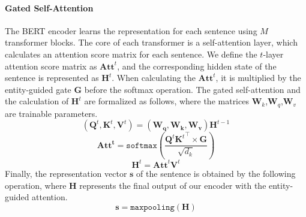 \documentclass[11pt]{article}
\begin{document}
\paragraph{Gated Self-Attention}
The BERT encoder learns the representation for each sentence using $M$ transformer blocks. The core of each transformer is a self-attention layer, which calculates an attention score matrix for each sentence. We define the $t$-layer attention score matrix as $\bm{Att}^{t}$, and the corresponding hidden state of the sentence is represented as $\bm{H}^t$. 
When calculating the $\bm{Att}^{t}$, it is multiplied by the entity-guided gate $\bm G$ before the softmax operation.  The gated self-attention and the calculation of $\bm{H}^t$ are formalized as follows, where the matrices $\bm W_k$,$\bm W_q$,$\bm W_v$ are trainable parameters.
\begin{equation}
(\bm Q^t,\bm K^t,\bm V^t) = (\bm {W_q},\bm {W_k},\bm {W_v})\bm H^{t-1}
\end{equation}
\begin{equation}
\bm{Att^t} = \mathtt{softmax}(
     \frac{\bm Q^t {\bm K^t}^\top \times \bm G}
     {\sqrt{d_k}}) 
\end{equation}
\begin{equation}
\bm{H}^t =\bm{Att}^{t}\bm{V}^{t}
\end{equation} 
Finally, the representation vector $\bm s$ of the sentence is obtained by the following operation, where $\bm H$ represents the final output of our encoder with the entity-guided attention.%
\begin{equation}  
\bm s = \mathtt{maxpooling}(\bm H )
\end{equation}
\end{document}
